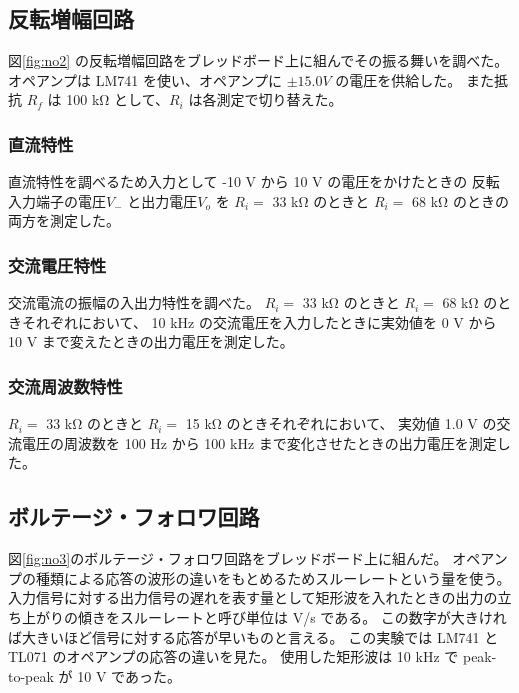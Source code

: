 \documentclass[11pt,dvipdfmx,a4paper]{jsarticle}
\begin{document}
\subsection{反転増幅回路}
図\ref{fig:no2} の反転増幅回路をブレッドボード上に組んでその振る舞いを調べた。
オペアンプは LM741 を使い、オペアンプに \(\pm 15.0 V\) の電圧を供給した。
また抵抗 \(R_f\) は 100 k\si{\ohm} として、\(R_i\) は各測定で切り替えた。
\subsubsection{直流特性}
直流特性を調べるため入力として -10 V から 10 V の電圧をかけたときの
反転入力端子の電圧\(V_{-}\) と出力電圧\(V_{o}\) を
\(R_i =\) 33 k\si{\ohm} のときと
\(R_i =\) 68 k\si{\ohm} のときの両方を測定した。

\subsubsection{交流電圧特性}
交流電流の振幅の入出力特性を調べた。
\(R_i =\) 33 k\si{\ohm} のときと
\(R_i =\) 68 k\si{\ohm} のときそれぞれにおいて、
10 kHz の交流電圧を入力したときに実効値を 0 V から 10 V まで変えたときの出力電圧を測定した。

\subsubsection{交流周波数特性}
\(R_i =\) 33 k\si{\ohm} のときと
\(R_i =\) 15 k\si{\ohm} のときそれぞれにおいて、
実効値 1.0 V の交流電圧の周波数を 100 Hz から 100 kHz まで変化させたときの出力電圧を測定した。

\subsection{ボルテージ・フォロワ回路}
図\ref{fig:no3}のボルテージ・フォロワ回路をブレッドボード上に組んだ。
オペアンプの種類による応答の波形の違いをもとめるためスルーレートという量を使う。
入力信号に対する出力信号の遅れを表す量として矩形波を入れたときの出力の立ち上がりの傾きをスルーレートと呼び単位は V/s である。
この数字が大きければ大きいほど信号に対する応答が早いものと言える。
この実験では LM741 と TL071 のオペアンプの応答の違いを見た。
使用した矩形波は 10 kHz で peak-to-peak が 10 V であった。
\end{document}
